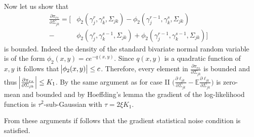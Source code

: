 \begin{condition}
    Now let us show that
    \begin{align*}
        \frac{\partial \pi_{rs}}{\partial \Sigma_{jk}}
        = \Big[&\phi_2({\gamma}_j^r, {\gamma}_k^s, \Sigma_{jk}) - \phi_2({\gamma}_j^{r-1}, {\gamma}_k^s, \Sigma_{jk}) \\
        - &\phi_2({\gamma}_j^r, {\gamma}_k^{s-1}, \Sigma_{jk}) + \phi_2({\gamma}_j^{r-1}, {\gamma}_k^{s-1}, \Sigma_{jk})\Big]
    \end{align*}    
    is bounded. Indeed the density of the standard bivariate normal random variable is of the form $\phi_2(x,y) = c e^{-q(x,y)}$. Since $q(x,y)$ is a quadratic function of $x,y$ it follows that $\abs{\phi_2(x,y)} \leq c$. Therefore, every element in $\frac{\partial \pi_{rs}}{\partial \Sigma_{jk}}$ is bounded and thus $\abs{\frac{\partial \pi_{rs}}{\partial \Sigma_{jk}}} \leq K_1$. By the same argument as for case II $\Big(\frac{\partial\ell_{jk}}{\partial \Sigma_{jk}} - \mathbb{E}\frac{\partial\ell_{jk}}{\partial \Sigma_{jk}} \Big)$ is zero-mean and bounded and by Hoeffding's lemma the gradient of the log-likelihood function is $\tau^2$-sub-Gaussian with $\tau = 2\xi K_1$. 
    
    From these arguments if follows that the gradient statistical noise condition is satisfied. 
\end{condition}

